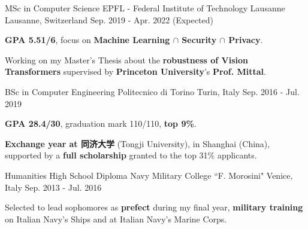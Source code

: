 

\begin{cventries}

  \cventry
  {MSc in Computer Science} %
  {EPFL - Federal Institute of Technology Lausanne} %
  {Lausanne, Switzerland} %
  {Sep. 2019 - Apr. 2022 (Expected)} %
  {
    \begin{cvitems} %
      \item \textbf{GPA 5.51/6}, focus on \textbf{Machine Learning $\cap$ Security $\cap$ Privacy}.
      \item Working on my Master's Thesis about the \textbf{robustness of Vision Transformers} supervised by \textbf{Princeton University}'s \textbf{Prof. Mittal}.
    \end{cvitems}
  }
  \cventry
  {BSc in Computer Engineering} %
  {Politecnico di Torino} %
  {Turin, Italy} %
  {Sep. 2016 - Jul. 2019} %
  {
    \begin{cvitems} %
      \item \textbf{GPA 28.4/30}, graduation mark 110/110, \textbf{top 9\%}.
      \item \textbf{Exchange year at 同济大学} (Tongji University), in Shanghai (China), supported by a \textbf{full scholarship} granted to the top 31\% applicants. \vspace{0.2cm}
    \end{cvitems}
  }
  \cventry
  {Humanities High School Diploma} %
  {Navy Military College ``F. Morosini"} %
  {Venice, Italy} %
  {Sep. 2013 - Jul. 2016} %
  {
    \begin{cvitems} %
      \item Selected to lead sophomores as \textbf{prefect} during my final year, \textbf{military training} on Italian Navy's Ships and at Italian Navy's Marine Corps.
    \end{cvitems}
  }

\end{cventries}
